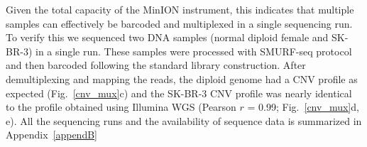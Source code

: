 Given the total capacity of the MinION instrument, this indicates that
multiple samples can effectively be barcoded and multiplexed in a single
sequencing run.
To verify this we sequenced two DNA samples (normal diploid female and
SK-BR-3) in a single run.  These samples were processed with SMURF-seq
protocol and then barcoded following the standard library construction.
After demultiplexing and mapping the reads, the diploid genome had a CNV
profile as expected (Fig.~\ref{cnv_mux}c) and the SK-BR-3 CNV profile
was nearly identical to the profile obtained using Illumina WGS (Pearson
$r$ = 0.99; Fig.~\ref{cnv_mux}d, e). All the sequencing runs and the
availability of sequence data is summarized in Appendix~\ref{appendB}
